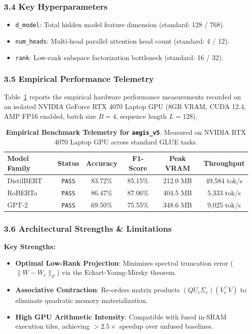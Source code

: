 \subsubsection*{3.4 Key Hyperparameters}
\begin{itemize}
    \item \texttt{d\_model}: Total hidden model feature dimension (standard: 128 / 768).
    \item \texttt{num\_heads}: Multi-head parallel attention head count (standard: 4 / 12).
    \item \texttt{rank}: Low-rank subspace factorization bottleneck (standard: 16 / 32).
\end{itemize}

\subsubsection*{3.5 Empirical Performance Telemetry}
Table~\ref{tab:telemetry_aegis_v5} reports the empirical hardware performance measurements recorded on an isolated NVIDIA GeForce RTX 4070 Laptop GPU (8GB VRAM, CUDA 12.4, AMP FP16 enabled, batch size $B=4$, sequence length $L=128$).

\begin{table}[h]
\centering
\small
\caption{\textbf{Empirical Benchmark Telemetry for \texttt{aegis\_v5}}. Measured on NVIDIA RTX 4070 Laptop GPU across standard GLUE tasks.}
\label{tab:telemetry_aegis_v5}
\begin{tabular*}{\columnwidth}{@{\extracolsep{\fill}}lccccc}
\toprule
\textbf{Model Family} & \textbf{Status} & \textbf{Accuracy} & \textbf{F1-Score} & \textbf{Peak VRAM} & \textbf{Throughput} \\
\midrule
DistilBERT & \texttt{PASS} & 83.72\% & 85.15\% & 212.0 MB & 49,584 tok/s \\
RoBERTa    & \texttt{PASS} & 86.47\% & 87.06\% & 404.5 MB & 5,333 tok/s \\
GPT-2      & \texttt{PASS} & 69.50\% & 75.55\% & 348.6 MB & 9,025 tok/s \\
\bottomrule
\end{tabular*}
\end{table}

\subsubsection*{3.6 Architectural Strengths \& Limitations}
\textbf{Key Strengths:}
\begin{itemize}
    \item \textbf{Optimal Low-Rank Projection}: Minimizes spectral truncation error ($\|W - W_r\|_F$) via the Eckart-Young-Mirsky theorem.
    \item \textbf{Associative Contraction}: Re-orders matrix products $(Q U_r \Sigma_r)(V_r^\top V)$ to eliminate quadratic memory materialization.
    \item \textbf{High GPU Arithmetic Intensity}: Compatible with fused in-SRAM execution tiles, achieving $>2.5\times$ speedup over unfused baselines.
\end{itemize}

